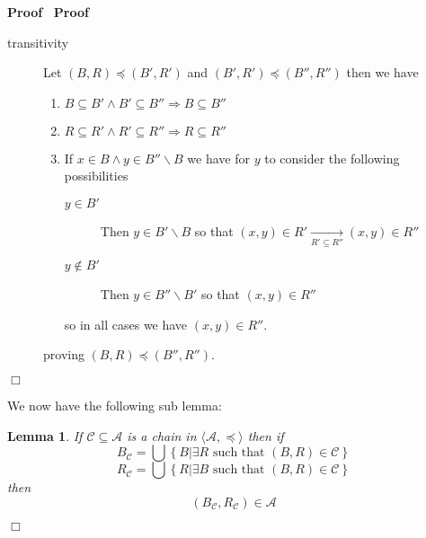 \documentclass{book}
\newcommand{\Rightarrowlim}{\mathop{\rightarrow}\limits}
\newcommand{\nin}{\not\in}
\newenvironment{proof}{\noindent\textbf{Proof\ }}{\hspace*{\fill}$\Box$\medskip}
\newtheorem{lemma}{Lemma}
\begin{document}
\begin{proof}
\begin{proof}
\begin{description}
      \item[transitivity] Let $(B, R) \preccurlyeq (B', R')$ and $(B', R')
      \preccurlyeq (B'', R'')$ then we have
      \begin{enumerate}
        \item $B \subseteq B' \wedge B' \subseteq B'' \Rightarrow B \subseteq
        B''$
        
        \item $R \subseteq R' \wedge R' \subseteq R'' \Rightarrow R \subseteq
        R''$
        
        \item If $x \in B \wedge y \in B'' \backslash B$ we have for $y$ to
        consider the following possibilities
        \begin{description}
          \item[$y \in B'$] Then $y \in B' \backslash B$ so that $(x, y) \in
          R' \Rightarrowlim_{R' \subseteq R''} (x, y) \in R''$
          
          \item[$y \nin B'$] Then $y \in B'' \backslash B'$ so that $(x, y)
          \in R''$
        \end{description}
        so in all cases we have $(x, y) \in R''$.
      \end{enumerate}
      proving $(B, R) \preccurlyeq (B'', R'')$.
    \end{description}
  \end{proof}
  
  We now have the following sub lemma:
  
  \begin{lemma}
    \label{choice lemma well ordering lemma (1)}If $\mathcal{C} \subseteq
    \mathcal{A}$ is a chain in $\langle \mathcal{A}, \preccurlyeq \rangle$
    then if
    \[ B_{\mathcal{C}} = \bigcup \left\{ B| \exists R \text{ such that } (B,
       R) \in \mathcal{C} \right\} \text{} \]
    \[ R_{\mathcal{C}} = \bigcup \left\{ R| \exists B \text{ such that } (B,
       R) \in \mathcal{C} \right\} \]
    then
    \[ \left( B_{\mathcal{C}} {, R_{\mathcal{C}}}  \right) \in \mathcal{A} \]
  \end{lemma}
  

\end{proof}
\end{document}

